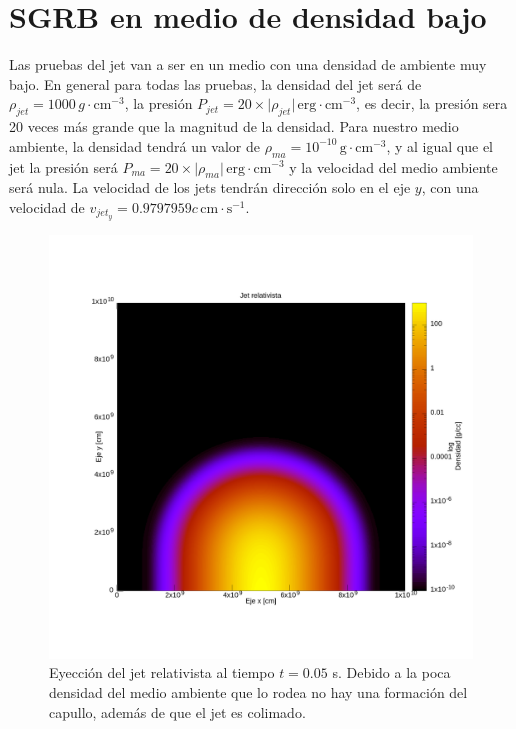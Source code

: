 \documentclass[12pt,a4paper]{book}
\begin{document}
\section{SGRB en medio de densidad bajo}


Las pruebas del jet van a ser en un medio con una densidad de ambiente muy bajo. En general para todas las pruebas, la densidad del jet será de $\rho_{jet}  = 1000 \, g \cdot \mathrm{cm}^{-3}$, la presión $P_{jet} = 20 \times  \lvert \rho_{jet} \rvert \, \mathrm{erg} \cdot \mathrm{cm}^{-3}$, es decir, la presión sera 20 veces más grande que la magnitud de la densidad. Para nuestro medio ambiente, la densidad tendrá un valor de $\rho_{ma}  = 10^{-10} \, \mathrm{g} \cdot \mathrm{cm}^{-3}$, y al igual que el jet la presión será $P_{ma} = 20 \times \lvert \rho_{ma} \rvert \, \mathrm{erg} \cdot \mathrm{cm}^{-3}$ y la velocidad del medio ambiente será nula. La velocidad de los jets tendrán dirección solo en el eje $y$, con una velocidad de $v_{jet_{y}} = 0.9797959c \, \mathrm{cm} \cdot \mathrm{s}^{-1}$.

\begin{figure}
\centering
\includegraphics[scale=0.15]{./Figuras/densidad_de_medios_ambientes/medio_bajo/jet_lax_5_ma_1^-10}
\caption{\label{fig:jet_ma_bajo_densidad}Eyección del jet relativista al tiempo $t = 0.05$ s. Debido a la poca densidad del medio ambiente que lo rodea no hay una formación del capullo, además de que el jet es colimado.}
\end{figure}
\end{document}
